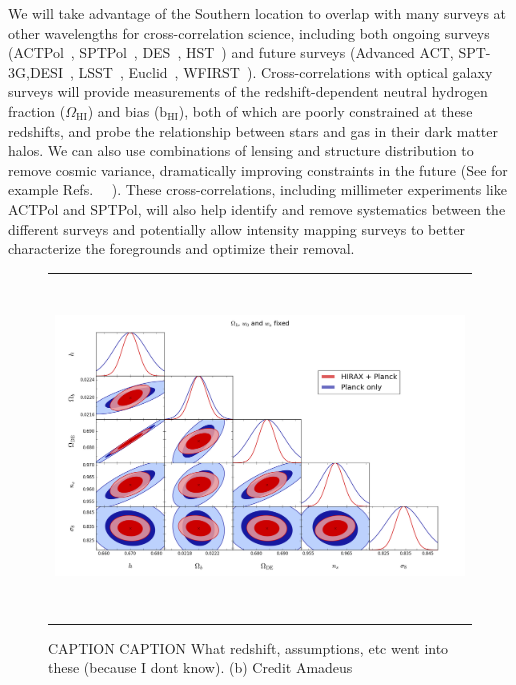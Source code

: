 \documentclass[]{spie}  %
\begin{document}
We will take advantage of the Southern location to overlap with many surveys at other wavelengths for cross-correlation science, including both ongoing surveys (ACTPol~\cite{2016arXiv160506569T}, SPTPol~\cite{2014SPIE.9153E..1PB}, DES~\cite{2016MNRAS.460.1270D}, HST~\cite{2014SPIE.9147E..5QW}) and future surveys (Advanced ACT, SPT-3G,DESI~\cite{2013arXiv1308.0847L}, LSST~\cite{2012arXiv1211.0310L}, Euclid~\cite{2012SPIE.8442E..0TL}, WFIRST~\cite{2013arXiv1305.5422S}). Cross-correlations with optical galaxy surveys will provide measurements of the redshift-dependent neutral hydrogen fraction ($\Omega_{\mathrm{HI}}$) and bias ($\mathrm{b}_{\mathrm{HI}}$), both of which are poorly constrained at these redshifts, and probe the relationship between stars and gas in their dark matter halos. We can also use combinations of lensing and structure distribution to remove cosmic variance, dramatically improving constraints in the future (See for example Refs. ~\cite{2009JCAP...10..007M}~\cite{2013MNRAS.432..318A}). These cross-correlations, including millimeter experiments like ACTPol and SPTPol, will also help identify and remove systematics between the different surveys and potentially allow intensity mapping surveys to better characterize the foregrounds and optimize their removal. \newline


    \begin{figure} [t]
   \begin{center}
   \begin{tabular}{c} %
  \includegraphics[height=9cm]{5pellipses_justHIRAX1.png}
   \end{tabular}
   \end{center}
   \caption[dish] 
   { \label{fig:params} 
CAPTION CAPTION What redshift, assumptions, etc went into these (because I dont know). (b) Credit Amadeus}
   \end{figure} 
\end{document}
